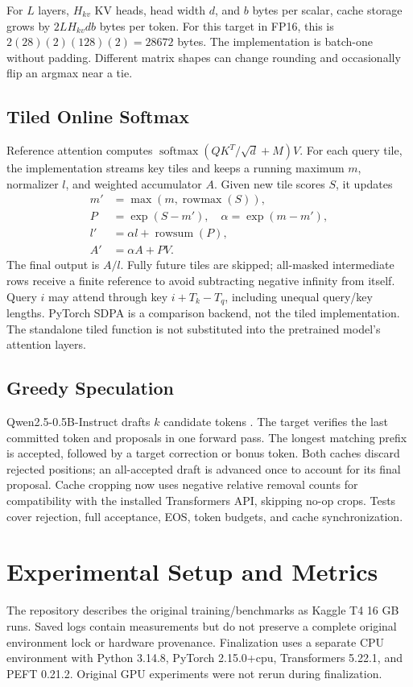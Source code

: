 \documentclass[conference]{IEEEtran}
\begin{document}
For $L$ layers, $H_{kv}$ KV heads, head width $d$, and $b$ bytes per scalar, cache storage grows by $2LH_{kv}db$ bytes per token. For this target in FP16, this is $2(28)(2)(128)(2)=28672$ bytes. The implementation is batch-one without padding. Different matrix shapes can change rounding and occasionally flip an argmax near a tie.

\subsection{Tiled Online Softmax}
Reference attention computes $\operatorname{softmax}(QK^T/\sqrt d+M)V$. For each query tile, the implementation streams key tiles and keeps a running maximum $m$, normalizer $l$, and weighted accumulator $A$. Given new tile scores $S$, it updates
\begin{align}
m'&=\max(m,\operatorname{rowmax}(S)),\\
P&=\exp(S-m'),\quad \alpha=\exp(m-m'),\\
l'&=\alpha l+\operatorname{rowsum}(P),\\
A'&=\alpha A+PV.
\end{align}
The final output is $A/l$. Fully future tiles are skipped; all-masked intermediate rows receive a finite reference to avoid subtracting negative infinity from itself. Query $i$ may attend through key $i+T_k-T_q$, including unequal query/key lengths. PyTorch SDPA is a comparison backend, not the tiled implementation. The standalone tiled function is not substituted into the pretrained model's attention layers.

\subsection{Greedy Speculation}
Qwen2.5-0.5B-Instruct drafts $k$ candidate tokens \cite{draft}. The target verifies the last committed token and proposals in one forward pass. The longest matching prefix is accepted, followed by a target correction or bonus token. Both caches discard rejected positions; an all-accepted draft is advanced once to account for its final proposal. Cache cropping now uses negative relative removal counts for compatibility with the installed Transformers API, skipping no-op crops. Tests cover rejection, full acceptance, EOS, token budgets, and cache synchronization.

\section{Experimental Setup and Metrics}
The repository describes the original training/benchmarks as Kaggle T4 16 GB runs. Saved logs contain measurements but do not preserve a complete original environment lock or hardware provenance. Finalization uses a separate CPU environment with Python 3.14.8, PyTorch 2.15.0+cpu, Transformers 5.22.1, and PEFT 0.21.2. Original GPU experiments were not rerun during finalization.
\end{document}

